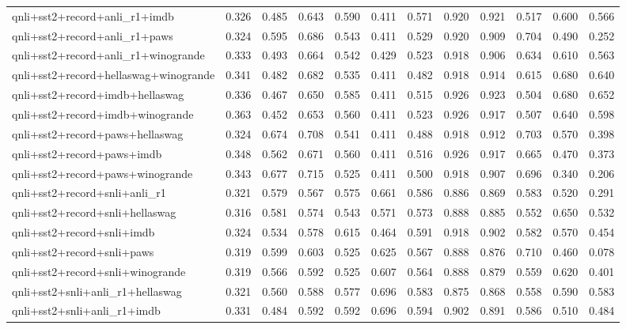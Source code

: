 \begin{table}[t]
\begin{tabular}{lrrrrrrrrrrr}
    qnli+sst2+record+anli\_r1+imdb & 0.326 & 0.485 & 0.643 & 0.590 & 0.411 & 0.571 & 0.920 & 0.921 & 0.517 & 0.600 & 0.566 \\
    qnli+sst2+record+anli\_r1+paws & 0.324 & 0.595 & 0.686 & 0.543 & 0.411 & 0.529 & 0.920 & 0.909 & 0.704 & 0.490 & 0.252 \\
    qnli+sst2+record+anli\_r1+winogrande & 0.333 & 0.493 & 0.664 & 0.542 & 0.429 & 0.523 & 0.918 & 0.906 & 0.634 & 0.610 & 0.563 \\
    qnli+sst2+record+hellaswag+winogrande & 0.341 & 0.482 & 0.682 & 0.535 & 0.411 & 0.482 & 0.918 & 0.914 & 0.615 & 0.680 & 0.640 \\
    qnli+sst2+record+imdb+hellaswag & 0.336 & 0.467 & 0.650 & 0.585 & 0.411 & 0.515 & 0.926 & 0.923 & 0.504 & 0.680 & 0.652 \\
    qnli+sst2+record+imdb+winogrande & 0.363 & 0.452 & 0.653 & 0.560 & 0.411 & 0.523 & 0.926 & 0.917 & 0.507 & 0.640 & 0.598 \\
    qnli+sst2+record+paws+hellaswag & 0.324 & 0.674 & 0.708 & 0.541 & 0.411 & 0.488 & 0.918 & 0.912 & 0.703 & 0.570 & 0.398 \\
    qnli+sst2+record+paws+imdb & 0.348 & 0.562 & 0.671 & 0.560 & 0.411 & 0.516 & 0.926 & 0.917 & 0.665 & 0.470 & 0.373 \\
    qnli+sst2+record+paws+winogrande & 0.343 & 0.677 & 0.715 & 0.525 & 0.411 & 0.500 & 0.918 & 0.907 & 0.696 & 0.340 & 0.206 \\
    qnli+sst2+record+snli+anli\_r1 & 0.321 & 0.579 & 0.567 & 0.575 & 0.661 & 0.586 & 0.886 & 0.869 & 0.583 & 0.520 & 0.291 \\
    qnli+sst2+record+snli+hellaswag & 0.316 & 0.581 & 0.574 & 0.543 & 0.571 & 0.573 & 0.888 & 0.885 & 0.552 & 0.650 & 0.532 \\
    qnli+sst2+record+snli+imdb & 0.324 & 0.534 & 0.578 & 0.615 & 0.464 & 0.591 & 0.918 & 0.902 & 0.582 & 0.570 & 0.454 \\
    qnli+sst2+record+snli+paws & 0.319 & 0.599 & 0.603 & 0.525 & 0.625 & 0.567 & 0.888 & 0.876 & 0.710 & 0.460 & 0.078 \\
    qnli+sst2+record+snli+winogrande & 0.319 & 0.566 & 0.592 & 0.525 & 0.607 & 0.564 & 0.888 & 0.879 & 0.559 & 0.620 & 0.401 \\
    qnli+sst2+snli+anli\_r1+hellaswag & 0.321 & 0.560 & 0.588 & 0.577 & 0.696 & 0.583 & 0.875 & 0.868 & 0.558 & 0.590 & 0.583 \\
    qnli+sst2+snli+anli\_r1+imdb & 0.331 & 0.484 & 0.592 & 0.592 & 0.696 & 0.594 & 0.902 & 0.891 & 0.586 & 0.510 & 0.484 \\

\end{tabular}
\end{table}
